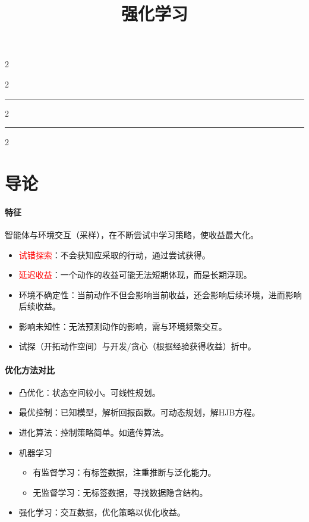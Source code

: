 \documentclass[
12pt, %
a4paper, 
oneside, %
]{scrartcl}
\title{强化学习}
\date{}
\begin{document}
\maketitle
\newpage
\hypertarget{toc}{}
\begingroup
\begin{multicols}{2}
\tableofcontents
\end{multicols}
\endgroup
\newpage
\begingroup
\begin{multicols}{2}
\listoffigures
\end{multicols}
\endgroup
\hrule
\begingroup
\begin{multicols}{2}
\listoftables
\end{multicols}
\endgroup
\hrule
\begingroup
\begin{multicols}{2}
\listofmyalgorithms
\end{multicols}
\endgroup
\newpage
\listoftips
\newpage
\section{导论}
\paragraph{特征}
智能体与环境交互（采样），在不断尝试中学习策略，使收益最大化。
\begin{itemize}
\item \textcolor{red}{试错探索}：不会获知应采取的行动，通过尝试获得。
\item \textcolor{red}{延迟收益}：一个动作的收益可能无法短期体现，而是长期浮现。
\item 环境不确定性：当前动作不但会影响当前收益，还会影响后续环境，进而影响后续收益。
\item 影响未知性：无法预测动作的影响，需与环境频繁交互。
\item 试探（开拓动作空间）与开发/贪心（根据经验获得收益）折中。
\end{itemize}
\paragraph{优化方法对比}
\begin{itemize}
\item 凸优化：状态空间较小。可线性规划。
\item 最优控制：已知模型，解析回报函数。可动态规划，解HJB方程。
\item 进化算法：控制策略简单。如遗传算法。
\item 机器学习
\begin{itemize}
\item 有监督学习：有标签数据，注重推断与泛化能力。
\item 无监督学习：无标签数据，寻找数据隐含结构。
\end{itemize}
\item 强化学习：交互数据，优化策略以优化收益。
\end{itemize}
\end{document}
